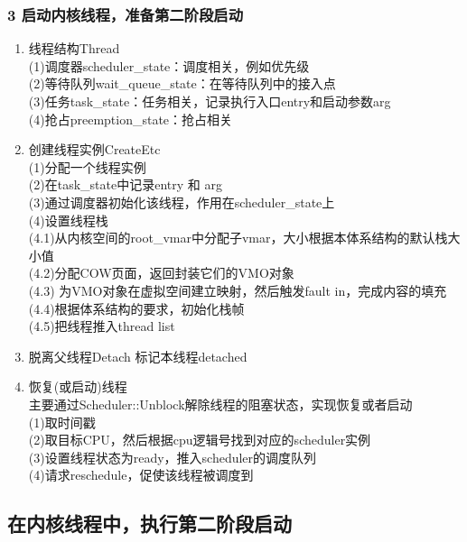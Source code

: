 \documentclass[
8pt, %
]{beamer}
\begin{document}
	\begin{frame}
		\frametitle{3 启动内核线程，准备第二阶段启动}
		\begin{enumerate}
			\item 线程结构Thread\\
			(1)调度器scheduler\_state：调度相关，例如优先级\\
			(2)等待队列wait\_queue\_state：在等待队列中的接入点\\
			(3)任务task\_state：任务相关，记录执行入口entry和启动参数arg\\
			(4)抢占preemption\_state：抢占相关\\
			\item 创建线程实例CreateEtc\\
			(1)分配一个线程实例\\
			(2)在task\_state中记录entry 和 arg\\
			(3)通过调度器初始化该线程，作用在scheduler\_state上\\
			(4)设置线程栈\\
			(4.1)从内核空间的root\_vmar中分配子vmar，大小根据本体系结构的默认栈大小值\\
			(4.2)分配COW页面，返回封装它们的VMO对象\\
			(4.3) 为VMO对象在虚拟空间建立映射，然后触发fault in，完成内容的填充\\
			(4.4)根据体系结构的要求，初始化栈帧\\
			(4.5)把线程推入thread list\\
			\item 脱离父线程Detach
			标记本线程detached
			\item 恢复(或启动)线程\\
			主要通过Scheduler::Unblock解除线程的阻塞状态，实现恢复或者启动\\
			(1)取时间戳\\
			(2)取目标CPU，然后根据cpu逻辑号找到对应的scheduler实例\\
			(3)设置线程状态为ready，推入scheduler的调度队列\\
			(4)请求reschedule，促使该线程被调度到
		\end{enumerate}
	\end{frame}

	\subsection{在内核线程中，执行第二阶段启动}
\end{document}
